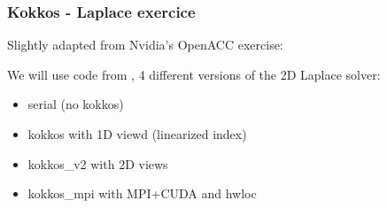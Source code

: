 \begin{frame}
  \frametitle{Kokkos - Laplace exercice}

  Slightly adapted from Nvidia's OpenACC exercise:\\

  We will use code from , 4 different versions of the 2D Laplace solver:
  \begin{itemize}
  \item serial (no kokkos)
  \item kokkos with 1D viewd (linearized index)
  \item kokkos\_v2 with 2D views
  \item kokkos\_mpi with MPI+CUDA and hwloc
  \end{itemize}
  
\end{frame}
